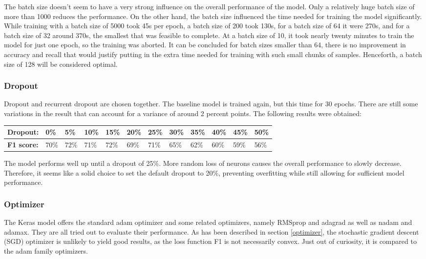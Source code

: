 \documentclass[
	a4paper,
	pagesize,
	pdftex,
	12pt,
	twoside, %
	BCOR=5mm, %
	ngerman,
	fleqn,
	final,
	]{scrartcl}
\begin{document}
The batch size doesn't seem to have a very strong influence on the overall performance of the model. Only a relatively huge batch size of more than 1000 reduces the performance. On the other hand, the batch size influenced the time needed for training the model significantly. While training with a batch size of 5000 took 45s per epoch, a batch size of 200 took 130s, for a batch size of 64 it were 270s, and for a batch size of 32 around 370s, the smallest that was feasible to complete. At a batch size of 10, it took nearly twenty minutes to train the model for just one epoch, so the training was aborted. It can be concluded for batch sizes smaller than 64, there is no improvement in accuracy and recall that would justify putting in the extra time needed for training with such small chunks of samples. Henceforth, a batch size of 128 will be considered optimal.

\subsubsection{Dropout}
Dropout and recurrent dropout are chosen together. The baseline model is trained again, but this time for 30 epochs. There are still some variations in the result that can account for a variance of around 2 percent points. The following results were obtained:

\begin{tabular} { | p{2cm} || p{0.7cm} | p{0.7cm} | p{0.7cm} | p{0.7cm}  | p{0.7cm} | p{0.7cm} | p{0.7cm} | p{0.7cm} | p{0.7cm} | p{0.7cm} | p{0.7cm} |}
\hline
\textbf{Dropout:}  & 0\% & 5\% & 10\% & 15\%   & 20\% & 25\% & 30\% & 35\% & 40\% & 45\% & 50\% \\   
\hline
\textbf{F1 score:} & 70\% & 72\% & 71\% & 72\% & 69\% & 71\% & 65\% & 62\% & 60\% & 59\% & 56\% \\
\hline
\hline
\end{tabular}

The model performs well up until a dropout of 25\%. More random loss of neurons causes the overall performance to slowly decrease. Therefore, it seems like a solid choice to set the default dropout to 20\%, preventing overfitting while still allowing for sufficient model performance.

\subsubsection{Optimizer}

The Keras model offers the standard adam optimizer and some related optimizers, namely RMSprop and adagrad as well as nadam and adamax. They are all tried out to evaluate their performance. As has been described in section \ref{optimizer}, the stochastic gradient descent (SGD) optimizer is unlikely to yield good results, as the loss function F1 is not necessarily convex. Just out of curiosity, it is compared to the adam family optimizers. 
\end{document}
